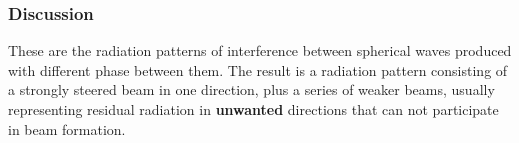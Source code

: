 \subsubsection{Discussion}

These are the radiation patterns of interference between spherical waves produced with different phase between them. The result is a radiation pattern consisting of a strongly steered beam in one direction, plus a series of weaker beams, usually representing residual radiation in \textbf{unwanted} directions that can not participate in beam formation.
